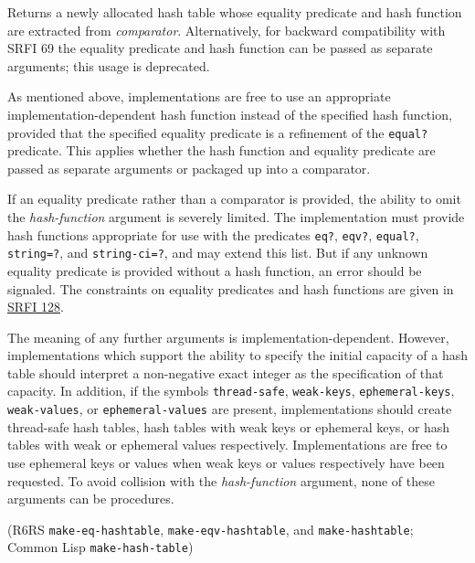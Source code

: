 \begin{entry}{%
  }

  Returns a newly allocated hash table whose equality predicate and
  hash function are extracted from \emph{comparator}. Alternatively,
  for backward compatibility with SRFI 69 the equality predicate and
  hash function can be passed as separate arguments; this usage is
  deprecated.

  As mentioned above, implementations are free to use an appropriate
  implementation-dependent hash function instead of the specified hash
  function, provided that the specified equality predicate is a
  refinement of the \texttt{equal?} predicate. This applies whether
  the hash function and equality predicate are passed as separate
  arguments or packaged up into a comparator.

  If an equality predicate rather than a comparator is provided, the
  ability to omit the \emph{hash-function} argument is severely
  limited.  The implementation must provide hash functions appropriate
  for use with the predicates \texttt{eq?}, \texttt{eqv?},
  \texttt{equal?}, \texttt{string=?}, and \texttt{string-ci=?}, and
  may extend this list.  But if any unknown equality predicate is
  provided without a hash function, an error should be signaled. The
  constraints on equality predicates and hash functions are given in
  \href{http://srfi.schemers.org/srfi-128/srfi-128.html}{SRFI 128}.

  The meaning of any further arguments is implementation-dependent.
  However, implementations which support the ability to specify the
  initial capacity of a hash table should interpret a non-negative
  exact integer as the specification of that capacity. In addition, if
  the symbols \texttt{thread-safe}, \texttt{weak-keys},
  \texttt{ephemeral-keys}, \texttt{weak-values}, or
  \texttt{ephemeral-values} are present, implementations should create
  thread-safe hash tables, hash tables with weak keys or ephemeral
  keys, or hash tables with weak or ephemeral values respectively.
  Implementations are free to use ephemeral keys or values when weak
  keys or values respectively have been requested. To avoid collision
  with the \emph{hash-function} argument, none of these arguments can
  be procedures.

  (R6RS \texttt{make-eq-hashtable}, \texttt{make-eqv-hashtable}, and
  \texttt{make-hashtable}; Common Lisp \texttt{make-hash-table})
\end{entry}

